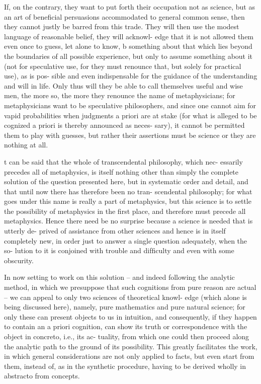 If, on the contrary, they want to put forth their occupation not as
science, but as an art of beneﬁcial persuasions accommodated to general
common sense, then they cannot justly be barred from this trade. They
will then use the modest language of reasonable belief, they will acknowl-
edge that it is not allowed them even once to guess, let alone to know, b
something about that which lies beyond the boundaries of all possible
experience, but only to assume something about it (not for speculative
use, for they must renounce that, but solely for practical use), as is pos-
sible and even indispensable for the guidance of the understanding and
will in life. Only thus will they be able to call themselves useful and wise
men, the more so, the more they renounce the name of metaphysicians;
for metaphysicians want to be speculative philosophers, and since one
cannot aim for vapid probabilities when judgments a priori are at stake
(for what is alleged to be cognized a priori is thereby announced as neces-
sary), it cannot be permitted them to play with guesses, but rather their
assertions must be science or they are nothing at all.

t can be said that the whole of transcendental philosophy, which nec-
essarily precedes all of metaphysics, is itself nothing other than simply
the complete solution of the question presented here, but in systematic
order and detail, and that until now there has therefore been no tran-
scendental philosophy; for what goes under this name is really a part of
metaphysics, but this science is to settle the possibility of metaphysics
in the ﬁrst place, and therefore must precede all metaphysics. Hence
there need be no surprise because a science is needed that is utterly de-
prived of assistance from other sciences and hence is in itself completely
new, in order just to answer a single question adequately, when the so-
lution to it is conjoined with trouble and difﬁculty and even with some
obscurity.

In now setting to work on this solution – and indeed following the
analytic method, in which we presuppose that such cognitions from pure
reason are actual – we can appeal to only two sciences of theoretical knowl-
edge (which alone is being discussed here), namely, pure mathematics and
pure natural science; for only these can present objects to us in intuition,
and consequently, if they happen to contain an a priori cognition, can
show its truth or correspondence with the object in concreto, i.e., its ac-
tuality, from which one could then proceed along the analytic path to
the ground of its possibility. This greatly facilitates the work, in which
general considerations are not only applied to facts, but even start from
them, instead of, as in the synthetic procedure, having to be derived
wholly in abstracto from concepts.

